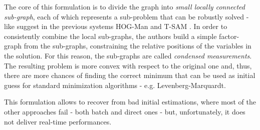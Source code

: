 The core of this formulation is to divide the graph into \textit{small locally connected sub-graph}, each of which represents a sub-problem that can be robustly solved - like suggest in the previous systems HOG-Man \cite{grisetti2010hogman} and T-SAM \cite{ni2010nestedDiss}. In order to consistently combine the local sub-graphs, the authors build a simple factor-graph from the sub-graphs, constraining the relative positions of the variables in the solution. For this reason, the sub-graphs are called \textit{condensed measurements}. The resulting problem is more convex with respect to the original one and, thus, there are more chances of finding the correct minimum that can be used as initial guess for standard minimization algorithms - e.g. Levenberg-Marquardt.

This formulation allows to recover from bad initial estimations, where most of the other approaches fail - both batch and direct ones - but, unfortunately, it does not deliver real-time performances.


